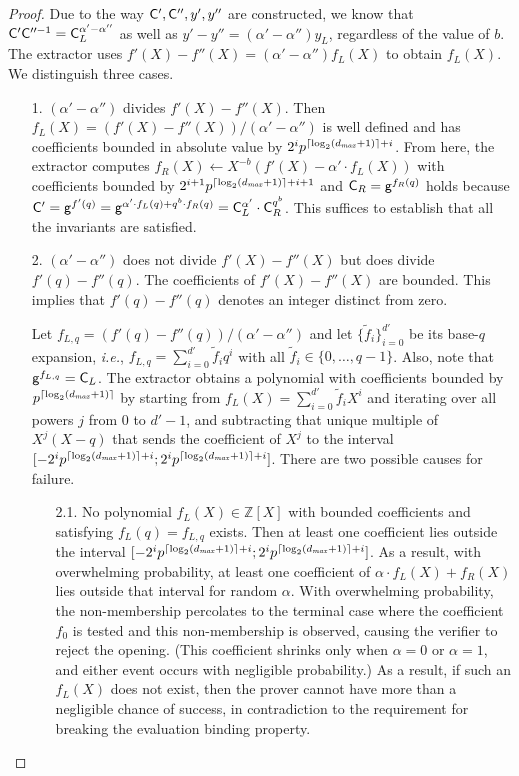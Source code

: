\documentclass{article}
\theoremstyle{definition}
\begin{document}
\begin{proof}
Due to the way $\mathsf{C}', \mathsf{C}'', y', y''$ are constructed, we know that $\mathsf{C}'\mathsf{C}''^{-1} = \mathsf{C}_L^{\alpha' - \alpha''}$ as well as $y'-y'' = (\alpha' - \alpha'')y_L$, regardless of the value of $b$. The extractor uses $f'(X)-f''(X) = (\alpha' - \alpha'')f_L(X)$ to obtain $f_L(X)$. We distinguish three cases.
\begin{itemize}
    \itemsep0pt
    \item[1.] $(\alpha' - \alpha'')$ divides $f'(X) - f''(X)$. Then $f_L(X) = (f'(X) - f''(X)) / (\alpha' - \alpha'')$ is well defined and has coefficients bounded in absolute value by $2^ip^{\lceil \log_2(d_{\it max} + 1) \rceil+i}$. From here, the extractor computes $f_R(X) \leftarrow X^{-b}( f'(X) - \alpha' \cdot f_L(X) )$ with coefficients bounded by $2^{i+1}p^{\lceil \log_2(d_{\it max} + 1) \rceil+i+1}$ and $\mathsf{C}_R = \mathsf{g}^{f_R(q)}$ holds because $\mathsf{C}' = \mathsf{g}^{f'(q)} = \mathsf{g}^{\alpha' \cdot f_L(q) + q^b \cdot f_R(q)} = \mathsf{C}_L^{\alpha'} \cdot \mathsf{C}_R^{q^b}$. This suffices to establish that all the invariants are satisfied.
    \item[2.] $(\alpha' - \alpha'')$ does not divide $f'(X) - f''(X)$ but does divide $f'(q) - f''(q)$. The coefficients of $f'(X) - f''(X)$ are bounded. This implies that $f'(q) - f''(q)$ denotes an integer distinct from zero.
    \item[] Let $f_{L,q} = (f'(q) - f''(q))/(\alpha' - \alpha'')$ and let $\{\tilde{f}_i\}_{i=0}^{d'}$ be its base-$q$ expansion, \emph{i.e.}, $f_{L,q} = \sum_{i=0}^{d'} \tilde{f}_i q^i$ with all $\tilde{f}_i \in \{0,\ldots,q-1\}$. Also, note that $\mathsf{g}^{f_{L,q}} = \mathsf{C}_L$. The extractor obtains a polynomial with coefficients bounded by $p^{\lceil \log_2(d_{\it max} + 1) \rceil}$ by starting from $f_L(X) = \sum_{i=0}^{d'} \tilde{f}_i X^i$ and iterating over all powers $j$ from 0 to $d'-1$, and subtracting that unique multiple of $X^{j}(X-q)$ that sends the coefficient of $X^j$ to the interval $[-2^ip^{\lceil \log_2(d_{\it max} + 1) \rceil+i};2^ip^{\lceil \log_2(d_{\it max} + 1) \rceil+i}]$. There are two possible causes for failure.
    \begin{itemize}
        \item[2.1.] No polynomial $f_L(X) \in \mathbb{Z}[X]$ with bounded coefficients and satisfying $f_L(q) = f_{L,q}$ exists. Then at least one coefficient lies outside the interval $[-2^ip^{\lceil \log_2(d_{\it max} + 1) \rceil+i};2^ip^{\lceil \log_2(d_{\it max} + 1) \rceil+i}]$. As a result, with overwhelming probability, at least one coefficient of $\alpha \cdot f_L(X) + f_R(X)$ lies outside that interval for random $\alpha$. With overwhelming probability, the non-membership percolates to the terminal case where the coefficient $f_0$ is tested and this non-membership is observed, causing the verifier to reject the opening. (This coefficient shrinks only when $\alpha=0$ or $\alpha=1$, and either event occurs with negligible probability.) As a result, if such an $f_L(X)$ does not exist, then the prover cannot have more than a negligible chance of success, in contradiction to the requirement for breaking the evaluation binding property.

\end{itemize}
\end{itemize}
\end{proof}
\end{document}
